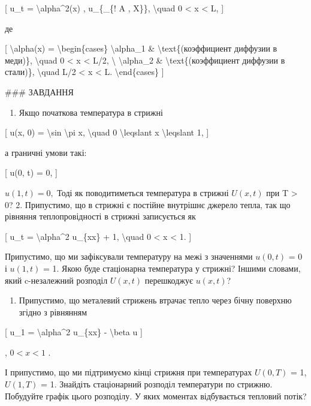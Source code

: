 \documentclass[
]{article}
\providecommand{\tightlist}{%
  \setlength{\itemsep}{0pt}\setlength{\parskip}{0pt}}
\begin{document}
{[} u\_t = \textbackslash alpha\^{}2(x) , u\_\{\_\{! A , X\}\},
\textbackslash quad 0 \textless{} x \textless{} L, {]}

де

{[} \textbackslash alpha(x) = \textbackslash begin\{cases\}
\textbackslash alpha\_1 \& \textbackslash text\{(коэффициент диффузии в
меди)\}, \textbackslash quad 0 \textless{} x \textless{} L/2,
\textbackslash{} \textbackslash alpha\_2 \&
\textbackslash text\{(коэффициент диффузии в стали)\},
\textbackslash quad L/2 \textless{} x \textless{} L.
\textbackslash end\{cases\} {]}

\#\#\# ЗАВДАННЯ

\begin{enumerate}
\def\labelenumi{\arabic{enumi}.}
\tightlist
\item
  Якщо початкова температура в стрижні
\end{enumerate}

{[} u(x, 0) = \textbackslash sin \textbackslash pi x,
\textbackslash quad 0 \textbackslash leqslant x \textbackslash leqslant
1, {]}

а граничні умови такі:

{[} u(0, t) = 0, {]}

\(u(1, t) = 0,\) Тоді як поводитиметься температура в стрижні
\(U(x, t)\) при T \textgreater{} 0? 2. Припустимо, що в стрижні є
постійне внутрішнє джерело тепла, так що рівняння теплопровідності в
стрижні записується як

{[} u\_t = \textbackslash alpha\^{}2 u\_\{xx\} + 1, \textbackslash quad
0 \textless{} x \textless{} 1. {]}

Припустимо, що ми зафіксували температуру на межі з значеннями
\(u(0, t)\) = 0 і \(u(1, t)\) = 1. Якою буде стаціонарна температура у
стрижні? Іншими словами, який c-незалежний розподіл \(U(x, t)\)
перешкоджує \(u(x, t)\)?

\begin{enumerate}
\def\labelenumi{\arabic{enumi}.}
\setcounter{enumi}{2}
\tightlist
\item
  Припустимо, що металевий стрижень втрачає тепло через бічну поверхню
  згідно з рівнянням
\end{enumerate}

{[} u\_1 = \textbackslash alpha\^{}2 u\_\{xx\} - \textbackslash beta u
{]}

, \(0 < x < 1\) .

І припустимо, що ми підтримуємо кінці стрижня при температурах
\(U(0, T)\) = 1, \(U(1, T)\) = 1. Знайдіть стаціонарний розподіл
температури по стрижню. Побудуйте графік цього розподілу. У яких
моментах відбувається тепловий потік?
\end{document}
